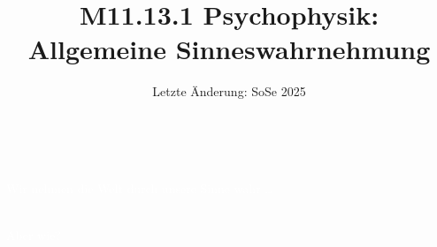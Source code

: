 \documentclass[aspectratio=169]{beamer}
\title[M11.13.1 Psychophysik]{M11.13.1 Psychophysik: \\ Allgemeine Sinneswahrnehmung}
\author[melanie.stefan@medicalschool-berlin.de]{}
\institute[]{Prof. Melanie Stefan \\ melanie.stefan@medcialschool-berlin.de}
\date{Letzte Änderung: SoSe 2025}
\begin{document}
{  
\begin{frame}

 \maketitle 

$\,$\\[6cm] 


\end{frame} 
}




{  
\begin{frame}
\textcolor{white}{Wir nehmen die Welt durch unsere Sinne wahr \dots}

$\,$\\[3.5cm]

\pause
\textcolor{white}{Aber wie?}

$\,$\\[4cm]

\end{frame}
}
\end{document}
